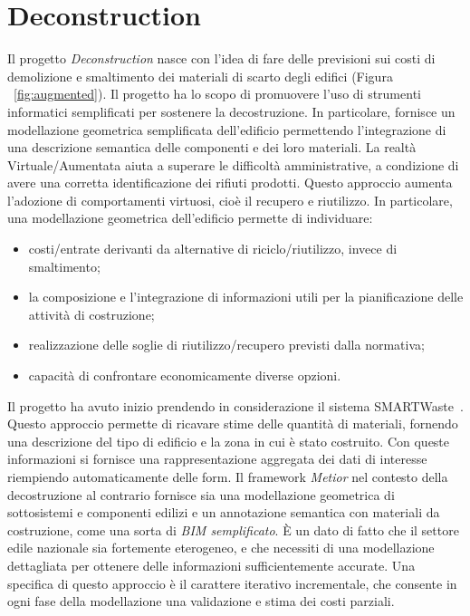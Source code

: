 \section{Deconstruction}
\label{sec:chapter_4_section_3}

Il progetto \emph{Deconstruction} nasce con l'idea di fare delle previsioni
sui costi di demolizione e smaltimento dei materiali di scarto degli edifici (Figura ~\ref{fig:augmented}).
Il progetto ha lo scopo di promuovere l'uso di strumenti informatici semplificati per sostenere la decostruzione.
In particolare, fornisce un modellazione geometrica semplificata dell'edificio permettendo l'integrazione di una descrizione
semantica delle componenti e dei loro materiali.
La realtà Virtuale/Aumentata aiuta a superare le difficoltà amministrative, a condizione di avere una
corretta identificazione dei rifiuti prodotti. Questo approccio aumenta l'adozione di comportamenti virtuosi,
cioè il recupero e riutilizzo.
In particolare, una modellazione geometrica dell'edificio permette di individuare:
\begin{itemize}
  \item  costi/entrate derivanti da alternative di riciclo/riutilizzo, invece di smaltimento;
  \item  la composizione e l'integrazione di informazioni utili per la pianificazione delle attività di costruzione;
  \item  realizzazione delle soglie di riutilizzo/recupero previsti dalla normativa;
  \item  capacità di confrontare economicamente diverse opzioni.
\end{itemize}

Il progetto ha avuto inizio prendendo in considerazione il sistema SMARTWaste~\cite{smartWaste}.
Questo approccio permette di ricavare stime delle quantità di materiali, fornendo una descrizione del tipo di edificio
e la zona in cui è stato costruito. Con queste informazioni si fornisce una rappresentazione aggregata dei dati di
interesse riempiendo automaticamente delle form.
Il framework \emph{Metior} nel contesto della decostruzione al contrario fornisce sia una modellazione geometrica di sottosistemi
e componenti edilizi e un annotazione semantica con materiali da costruzione, come una sorta di \emph{BIM semplificato}.
È un dato di fatto che il settore edile nazionale sia fortemente eterogeneo, e che necessiti di una modellazione
dettagliata per ottenere delle informazioni sufficientemente accurate.
Una specifica di questo approccio è il carattere iterativo incrementale,
che consente in ogni fase della modellazione una validazione e stima dei costi parziali.

